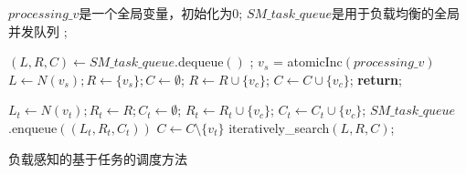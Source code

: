 \begin{algorithm} [H]
  \begin{algorithmic}[1]
    \normalsize

    \STATE $processing\_v$是一个全局变量，初始化为0;
    \STATE $SM\_task\_queue$是用于负载均衡的全局并发队列 ;
     
    \renewcommand{\algorithmicwhile}{\textbf{procedure}}
    \renewcommand{\algorithmicdo}{\textbf{:}}
    

    \renewcommand{\algorithmicwhile}{\textbf{while}}
    \renewcommand{\algorithmicdo}{\textbf{do}}
          \STATE $(L,R,C) \leftarrow SM\_task\_queue$\textsf{.dequeue}$()$ ;
        \ELSE
          \STATE $v_s$ = \textsf{atomicInc}$(processing\_v)$
            \STATE $L \leftarrow N(v_s); R\leftarrow\{v_s\}; C\leftarrow \emptyset $;
                \STATE $R \leftarrow R \cup \{v_c\}$;
                \STATE $C \leftarrow C \cup \{v_c\}$;
              \ENDIF
            \ENDFOR
          \ELSE
            \STATE \textbf{return};
          \ENDIF
        \ENDIF

              \STATE $L_t \leftarrow N(v_t); R_t\leftarrow R; C_t\leftarrow \emptyset $;
                  \STATE $R_t \leftarrow R_t \cup \{v_c\}$;
                  \STATE $C_t \leftarrow C_t \cup \{v_c\}$;
                \ENDIF
              \ENDFOR
              \STATE $SM\_task\_queue$\textsf{.enqueue}$((L_t, R_t, C_t))$
              \STATE $C \leftarrow C \setminus \{v_t\}$\;
            \ENDFOR
          \ELSE
            \STATE \textsf{iteratively\_search}$(L,R,C)$;
          \ENDIF

        \ENDIF
      \ENDWHILE
    \ENDWHILE 

  \end{algorithmic}
  \caption{负载感知的基于任务的调度方法}
  \label{alg:gmbe_task_full}
\end{algorithm}